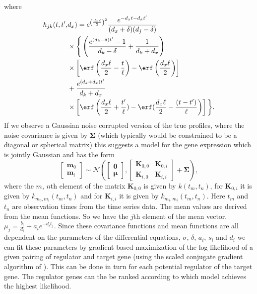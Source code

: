 \documentclass{article}
\begin{document}
where
\begin{align*}
  h_{jk}(t, t^\prime,& d_x) =  e^{\left(\frac{d_x \ell}{2}\right)^2}
  \frac{e^{-d_x t - d_k t^\prime}}{(d_x + \delta) (d_j - \delta)} \\
  &\times\Bigg\{
  \left(\frac{e^{(d_k-\delta) t^\prime} - 1}{d_k-\delta} +
    \frac{1}{d_k + d_x} \right)\\
  &\times \left[\erf\left(\frac{d_x \ell}{2} - \frac{t}{\ell}\right) - \erf\left(\frac{d_x \ell}{2}\right)\right]
  \\
  &+ \frac{e^{(d_k+d_x)t^\prime}}{d_k+d_x}\\
  &\times\left[\erf\left(\frac{d_x \ell}{2} + \frac{t^\prime}{\ell})
  - \erf(\frac{d_x \ell}{2} - \frac{(t-t^\prime)}{\ell}\right)\right]
  \bigg\}.
\end{align*}
If we  observe a Gaussian noise corrupted  version of the
true   profiles,   where   the    noise   covariance   is   given   by
$\boldsymbol{\Sigma}$ (which  typically would  be constrained to  be a
diagonal  or spherical  matrix) this  suggests  a model  for the  gene
expression which is jointly Gaussian and has the form
\begin{equation}
  \left[\begin{matrix}
      \mathbf{m}_0\\
      \mathbf{m}_i
    \end{matrix}\right]
  \sim \mathcal{N}\left(\left[\begin{matrix}\mathbf{0}\\\boldsymbol{\mu}\end{matrix}\right], \left[\begin{matrix}
        \mathbf{K}_{0,0} & \mathbf{K}_{0,i}\\
        \mathbf{K}_{i,0} & \mathbf{K}_{i,i}
      \end{matrix}
    \right] + \boldsymbol{\Sigma}\right),
\end{equation}
where the $m$, $n$th element of the matrix $\mathbf{K}_{0,0}$ is given
by   $k(t_m,t_n)$,    for   $\mathbf{K}_{0,i}$   it    is   given   by
$k_{m_0,m_i}(t_m,  t_n)$ and for  $\mathbf{K}_{i, i}$  it is  given by
$k_{m_i, m_i}(t_m,  t_n)$. Here $t_m$ and $t_n$  are observation times
from the time  series data. The mean values are  derived from the mean
functions.   So  we  have  the  $j$th  element  of  the  mean  vector,
$\mu_j=\frac{b_i}{d_i}  +  a_ie^{-d_it_j}$.   Since  these  covariance
functions and  mean functions are  all dependent on the  parameters of
the differential equations, $\sigma$, $\delta$, $a_i$, $s_i$ and $d_i$
we can fit these parameters  by gradient based maximization of the log
likelihood of a given pairing  of regulator and target gene (using the
scaled conjugate gradient  algorithm of \cite{Moller:scg93}). This can
be done in turn for each  potential regulator of the target gene.  The
regulator genes  can the be  ranked according to which  model achieves
the highest likelihood.
\end{document}
